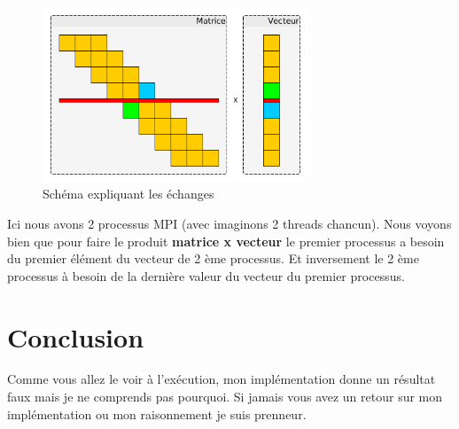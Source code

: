\documentclass[12pt, letterpaper]{article}
\begin{document}
\begin{figure}[htbp]
\centering
\includegraphics[width=300px]{../ressources/matrice_vecteur.png}
\caption{\label{fig:orgc4768f4}Schéma expliquant les échanges}
\end{figure}

Ici nous avons 2 processus MPI (avec imaginons 2 threads chancun). Nous voyons
bien que pour faire le produit \textbf{matrice x vecteur} le premier processus a
besoin du premier élément du vecteur de 2 ème processus. Et inversement le 2
ème processus à besoin de la dernière valeur du vecteur du premier processus.

\section{Conclusion}
\label{sec:orgc1d6d1d}

Comme vous allez le voir à l'exécution, mon implémentation donne un résultat
faux mais je ne comprends pas pourquoi. Si jamais vous avez un retour sur mon
implémentation ou mon raisonnement je suis prenneur.
\end{document}
